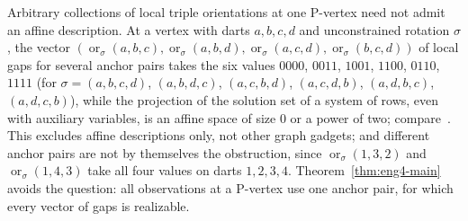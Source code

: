 \begin{remark}\label{rem:eng4-anchors}
Arbitrary collections of local triple orientations at one P-vertex need not
admit an affine description. At a vertex with darts $a,b,c,d$ and
unconstrained rotation $\sigma$, the vector
$(\operatorname{or}_\sigma(a,b,c),\operatorname{or}_\sigma(a,b,d),
\operatorname{or}_\sigma(a,c,d),\operatorname{or}_\sigma(b,c,d))$ of local
gaps for several anchor pairs takes the six values $0000$, $0011$, $1001$,
$1100$, $0110$, $1111$ (for $\sigma=(a,b,c,d)$, $(a,b,d,c)$, $(a,c,b,d)$,
$(a,c,d,b)$, $(a,d,b,c)$, $(a,d,c,b)$), while the projection of the solution
set of a system of rows, even with auxiliary variables, is an affine space of
size $0$ or a power of two; compare~\cite[Section~8.1]{Pfr22}. This excludes
affine descriptions only, not other graph gadgets; and different anchor pairs
are not by themselves the obstruction, since $\operatorname{or}_\sigma(1,3,2)$
and $\operatorname{or}_\sigma(1,4,3)$ take all four values on darts
$1,2,3,4$. Theorem~\ref{thm:eng4-main} avoids the question: all observations
at a P-vertex use one anchor pair, for which every vector of gaps is
realizable.
\end{remark}
